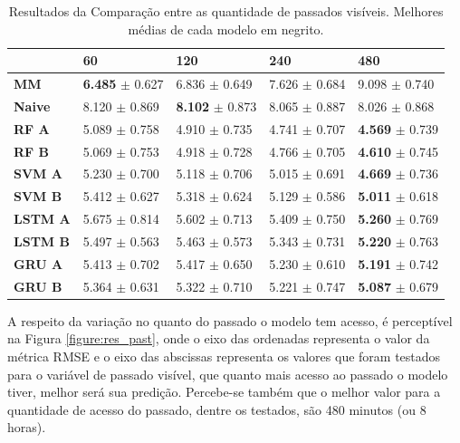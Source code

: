 \begin{table}[htbp]
    \begin{tabular*}{\linewidth}{@{\extracolsep{\fill}}lllll}
    \toprule
     & 
    \multicolumn{1}{l}{\textbf{60}} & 
    \multicolumn{1}{l}{\textbf{120}} &
    \multicolumn{1}{l}{\textbf{240}} &
    \multicolumn{1}{l}{\textbf{480}} \\
    \midrule
    \textbf{MM} & \textbf{6.485} $\pm$ 0.627 & 6.836 $\pm$ 0.649 & 7.626 $\pm$ 0.684 & 9.098 $\pm$ 0.740
    \\
    \midrule
    \textbf{Naive} & 8.120 $\pm$ 0.869 & \textbf{8.102} $\pm$ 0.873 & 8.065 $\pm$ 0.887 & 8.026 $\pm$ 0.868 
    \\
    \midrule
    \textbf{RF A} & 5.089 $\pm$ 0.758 & 4.910 $\pm$ 0.735 & 4.741 $\pm$ 0.707 & \textbf{4.569} $\pm$ 0.739 
    \\
    \midrule
    \textbf{RF B} & 5.069 $\pm$ 0.753 & 4.918 $\pm$ 0.728 & 4.766 $\pm$ 0.705 & \textbf{4.610} $\pm$ 0.745 
    \\
    \midrule
    \textbf{SVM A} & 5.230 $\pm$ 0.700 & 5.118 $\pm$ 0.706 & 5.015 $\pm$ 0.691 & \textbf{4.669} $\pm$ 0.736 
    \\
    \midrule
    \textbf{SVM B} & 5.412 $\pm$ 0.627 & 5.318 $\pm$ 0.624 & 5.129 $\pm$ 0.586 & \textbf{5.011} $\pm$ 0.618 
    \\
    \midrule
    \textbf{LSTM A} & 5.675 $\pm$ 0.814 & 5.602 $\pm$ 0.713 & 5.409 $\pm$ 0.750 & \textbf{5.260} $\pm$ 0.769 
    \\
    \midrule
    \textbf{LSTM B} & 5.497 $\pm$ 0.563 & 5.463 $\pm$ 0.573 & 5.343 $\pm$ 0.731 & \textbf{5.220} $\pm$ 0.763 
    \\
    \midrule
    \textbf{GRU A} & 5.413 $\pm$ 0.702 & 5.417 $\pm$ 0.650 & 5.230 $\pm$ 0.610 & \textbf{5.191} $\pm$ 0.742 
    \\
    \midrule
    \textbf{GRU B} & 5.364 $\pm$ 0.631 & 5.322 $\pm$ 0.710 & 5.221 $\pm$ 0.747 & \textbf{5.087} $\pm$ 0.679
    \\
    \bottomrule
    \end{tabular*}
    \label{table:res_past}
    \caption{Resultados da Comparação entre as quantidade de passados visíveis. Melhores médias de cada modelo em negrito.}
\end{table}
 

A respeito da variação no quanto do passado o modelo tem acesso, é perceptível na Figura \ref{figure:res_past}, onde o eixo das ordenadas representa o valor da métrica \acrshort{RMSE} e o eixo das abscissas representa os valores que foram testados para o variável de passado visível, que quanto mais acesso ao passado o modelo tiver, melhor será sua predição. Percebe-se também que o melhor valor para a quantidade de acesso do passado, dentre os testados, são 480 minutos (ou 8 horas). 

